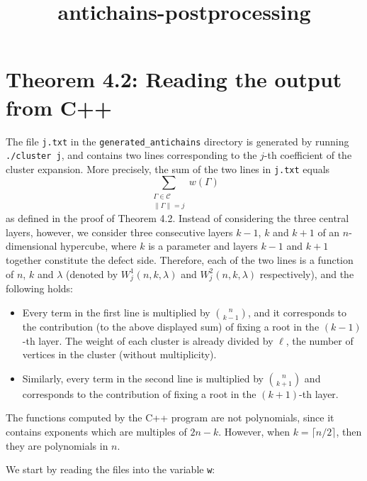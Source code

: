 \documentclass[11pt]{article}
\title{antichains-postprocessing}
\providecommand{\tightlist}{%
      \setlength{\itemsep}{0pt}\setlength{\parskip}{0pt}}
\begin{document}
    
    \maketitle
    
    

    
    \section{Theorem 4.2: Reading the output from
C++}\label{theorem-4.2-reading-the-output-from-c}

    The file \texttt{j.txt} in the \texttt{generated\_antichains} directory
is generated by running \texttt{./cluster\ j}, and contains two lines
corresponding to the \(j\)-th coefficient of the cluster expansion. More
precisely, the sum of the two lines in \texttt{j.txt} equals
\[\sum_{\substack{\Gamma \in \mathcal{C} \\ \lVert \Gamma \rVert = j}} w(\Gamma)\]
as defined in the proof of Theorem 4.2. Instead of considering the three
central layers, however, we consider three consecutive layers \(k-1\),
\(k\) and \(k+1\) of an \(n\)-dimensional hypercube, where \(k\) is a
parameter and layers \(k-1\) and \(k+1\) together constitute the defect
side. Therefore, each of the two lines is a function of \(n\), \(k\) and
\(\lambda\) (denoted by \(W^1_j(n, k, \lambda)\) and
\(W^2_j(n, k, \lambda)\) respectively), and the following holds:

\begin{itemize}
\tightlist
\item
  Every term in the first line is multiplied by \(\binom{n}{k-1}\), and
  it corresponds to the contribution (to the above displayed sum) of
  fixing a root in the \((k-1)\)-th layer. The weight of each cluster is
  already divided by \(\ell\), the number of vertices in the cluster
  (without multiplicity).
\item
  Similarly, every term in the second line is multiplied by
  \(\binom{n}{k+1}\) and corresponds to the contribution of fixing a
  root in the \((k+1)\)-th layer.
\end{itemize}

The functions computed by the C++ program are not polynomials, since it
contains exponents which are multiples of \(2n-k\). However, when
\(k = \lceil n/2 \rceil\), then they are polynomials in \(n\).

We start by reading the files into the variable \texttt{w}:
\end{document}
